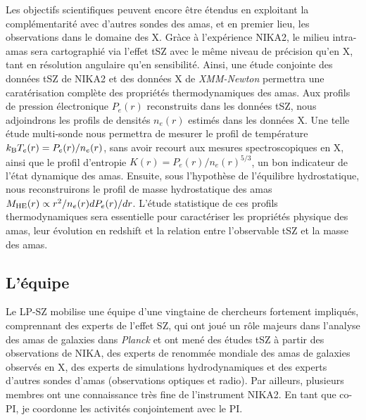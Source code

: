 Les objectifs scientifiques peuvent encore être étendus en exploitant
la complémentarité avec d'autres sondes des amas, et en premier lieu,
les observations dans le domaine des X. Gràce à l'expérience NIKA2, le
milieu intra-amas sera cartographié via l'effet tSZ avec le même
niveau de précision qu'en X, tant en résolution angulaire qu'en
sensibilité. Ainsi, une étude conjointe des données tSZ de NIKA2 et
des données X de \emph{XMM-Newton} permettra une caratérisation
complète des propriétés thermodynamiques des amas. Aux profils de
pression électronique $P_e(r)$ reconstruits dans les données tSZ, nous
adjoindrons les profils de densités $n_e(r)$ estimés dans les données
X. Une telle étude multi-sonde nous permettra de mesurer le profil de
température $k_{\rm{B}} T_e(r) = P_e(r)/n_e(r)$, sans avoir recourt
aux mesures spectroscopiques en X, ainsi que le profil
d'entropie $K(r) = P_e(r)/n_e(r)^{5/3}$, un bon indicateur de l'état
dynamique des amas. Ensuite, sous l'hypothèse de l'équilibre
hydrostatique, nous reconstruirons le profil de masse hydrostatique
des amas $M_{\rm{HE}} (r) \propto r^2/n_e(r) dP_e(r)/dr$.  
L'étude statistique de ces profils thermodynamiques sera essentielle
pour caractériser les propriétés physique des amas, leur évolution en
redshift et la relation entre l'observable tSZ et la masse des amas.  


\subsection{L'équipe}
Le LP-SZ mobilise une équipe d'une vingtaine de chercheurs fortement
impliqués, comprennant des experts de l'effet SZ, qui ont joué un rôle
majeurs dans l'analyse des amas de galaxies dans \emph{Planck} et ont
mené des études tSZ à partir des observations de NIKA, des experts de
renommée mondiale des amas de galaxies observés en X, des experts de
simulations hydrodynamiques et des experts d'autres sondes d'amas
(observations optiques et radio). Par ailleurs, plusieurs membres ont
une connaissance très fine de l'instrument NIKA2. En tant que co-PI,
je coordonne les activités conjointement avec le PI.



%
%
%
%
%
%
%
%
